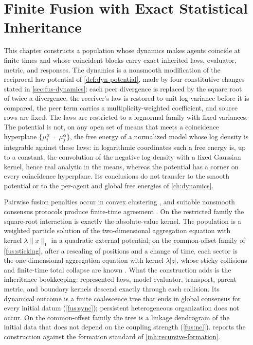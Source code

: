 \chapter{Finite Fusion with Exact Statistical Inheritance}
\label{ch:fusion}

This chapter constructs a population whose dynamics makes agents coincide at finite times and whose coincident blocks carry exact inherited laws, evaluator, metric, and responses. The dynamics is a nonsmooth modification of the reciprocal law potential of \cref{def:dyn-potential}, made by four constitutive changes stated in \cref{sec:fus-dynamics}: each peer divergence is replaced by the square root of twice a divergence, the receiver's law is restored to unit log variance before it is compared, the peer term carries a multiplicity-weighted coefficient, and source rows are fixed. The laws are restricted to a lognormal family with fixed variances. The potential is not, on any open set of means that meets a coincidence hyperplane $\{\mu_i^\alpha=\mu_j^\alpha\}$, the free energy of a normalized model whose log density is integrable against these laws: in logarithmic coordinates such a free energy is, up to a constant, the convolution of the negative log density with a fixed Gaussian kernel, hence real analytic in the means, whereas the potential has a corner on every coincidence hyperplane. Its conclusions do not transfer to the smooth potential or to the per-agent and global free energies of \cref{ch:dynamics}.

Pairwise fusion penalties occur in convex clustering \cite{Hocking2011}, and suitable nonsmooth consensus protocols produce finite-time agreement \cite{Cortes2006}. On the restricted family the square-root interaction is exactly the absolute-value kernel. The population is a weighted particle solution of the two-dimensional aggregation equation with kernel $\lambda\|x\|_1$ in a quadratic external potential; on the common-offset family of \cref{fus:sticking}, after a rescaling of positions and a change of time, each sector is the one-dimensional aggregation equation with kernel $\lambda|z|$, whose sticky collisions and finite-time total collapse are known \cite{CarrilloEtAl2011,BonaschiEtAl2015}. What the construction adds is the inheritance bookkeeping: represented laws, model evaluator, transport, parent metric, and boundary kernels descend exactly through each collision. Its dynamical outcome is a finite coalescence tree that ends in global consensus for every initial datum (\cref{fus:sync}); persistent heterogeneous organization does not occur. On the common-offset family the tree is a linkage dendrogram of the initial data that does not depend on the coupling strength (\cref{fus:ncl}).  reports the construction against the formation standard of \cref{inh:recursive-formation}.

